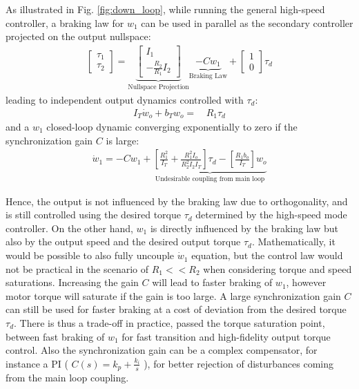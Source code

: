 As illustrated in Fig. \ref{fig:down_loop}, while running the general high-speed controller, a braking law for $w_1$ can be used in parallel as the secondary controller projected on the output nullspace:
\begin{align}
\left[ \begin{array}{c}
\tau_1 \\
\tau_2
\end{array} \right]
 = 
\underbrace{\left[ \begin{array}{c}
I_1 \\
-\frac{R_2 }{R_1 }  I_2
\end{array} \right]}_{\text{Nullspace Projection}} \underbrace{-C w_1}_{\text{Braking Law}} + 
\left[ \begin{array}{c}
1 \\
0 
\end{array} \right]  \tau_d
\label{eq:syncrhonization_ctl}
\end{align}
leading to independent output dynamics controlled with $\tau_d$:
\begin{align}
I_T \dot{w}_o +
b_T  w_o
=& \, R_1 \tau_d  
\end{align}
and a $w_1$ closed-loop dynamic converging exponentially to zero if the synchronization gain $C$ is large:
\begin{align}
 \dot{w}_1 = -C w_1 + \underbrace{\left[\frac{R_1^2}{I_T} + \frac{R_1^2 I_o}{R_2^2 I_2 I_T} \right] \tau_d - \left[\frac{R_1 b_o}{I_T}\right] w_o }_{\text{Undesirable coupling from main loop}}
\end{align}

Hence, the output is not influenced by the braking law due to orthogonality, and is still controlled using the desired torque $\tau_d$ determined by the high-speed mode controller. On the other hand, $w_1$ is directly influenced by the braking law but also by the output speed and the desired output torque $\tau_d$. Mathematically, it would be possible to also fully uncouple $\dot{w}_1$ equation, but the control law would not be practical in the scenario of $R_1<<R_2$ when considering torque and speed saturations. Increasing the gain $C$ will lead to faster braking of $w_1$, however motor torque will saturate if the gain is too large. A large synchronization gain $C$ can still be used for faster braking at a cost of deviation from the desired torque $\tau_d$. There is thus a trade-off in practice, passed the torque saturation point, between fast braking of $w_1$ for fast transition and high-fidelity output torque control. Also the synchronization gain can be a complex compensator, for instance a PI ( $C(s) = k_p + \frac{k_i}{s}$ ), for better rejection of disturbances coming from the main loop coupling. 


